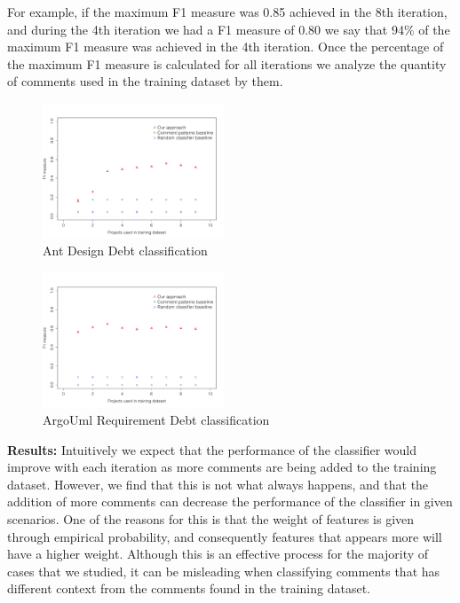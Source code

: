 For example, if the maximum F1 measure was 0.85 achieved in the 8th iteration, and during the 4th iteration we had a F1 measure of 0.80 we say that 94\% of the maximum F1 measure was achieved in the 4th iteration. Once the percentage of the maximum F1 measure is calculated for all iterations we analyze the quantity of comments used in the training dataset by them.

\begin{figure}[t]
  \centering
  \includegraphics[width = 0.48\textwidth]{figures/design_ant.pdf}
  \vspace{-3mm}
  \caption{Ant Design Debt classification}
  \label{fig:design_ant_result}
\end{figure}

\begin{figure}[t]
  \centering
  \includegraphics[width = 0.48\textwidth]{figures/implementation_argo.pdf}
  \vspace{-3mm}
  \caption{ArgoUml Requirement Debt classification}
  \label{fig:implementation_argo_result}
\end{figure}

\vspace{1mm}
\noindent \textbf{Results:} Intuitively we expect that the performance of the classifier would improve with each iteration as more comments are being added to the training dataset. However, we find that this is not what always happens, and that the addition of more comments can decrease the performance of the classifier in given scenarios. One of the reasons for this is that the weight of features is given through empirical probability, and consequently features that appears more will have a higher weight. Although this is an effective process for the majority of cases that we studied, it can be misleading when classifying comments that has different context from the comments found in the training dataset. 

